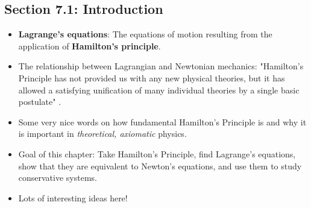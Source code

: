 \documentclass[../notes.tex]{subfiles}
\begin{document}
\subsection*{Section 7.1: Introduction}
\begin{itemize}
    \item \textbf{Lagrange's equations}: The equations of motion resulting from the application of \textbf{Hamilton's principle}.
    \item The relationship between Lagrangian and Newtonian mechanics: "Hamilton's Principle has not provided us with any new physical theories, but it has allowed a satisfying unification of many individual theories by a single basic postulate" \parencite[229]{bib:ThorntonMarion}.
    \item Some very nice words on how fundamental Hamilton's Principle is and why it is important in \emph{theoretical, axiomatic} physics.
    \item Goal of this chapter: Take Hamilton's Principle, find Lagrange's equations, show that they are equivalent to Newton's equations, and use them to study conservative systems.
    \item Lots of interesting ideas here!
\end{itemize}
\end{document}
